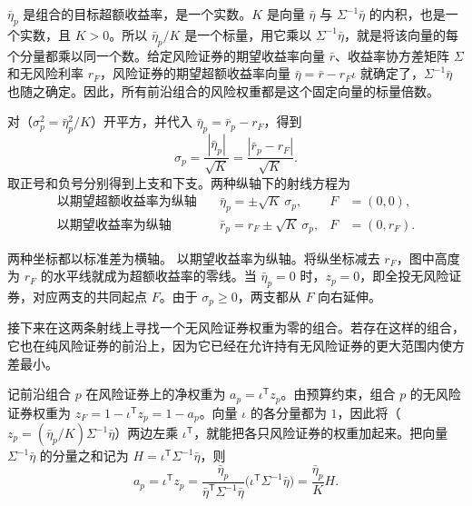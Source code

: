 $\bar\eta_p$ 是组合的目标超额收益率，是一个实数。$K$ 是向量 $\bar\eta$ 与 $\Sigma^{-1}\bar\eta$ 的内积，也是一个实数，且 $K>0$。所以 $\bar\eta_p/K$ 是一个标量，用它乘以 $\Sigma^{-1}\bar\eta$，就是将该向量的每个分量都乘以同一个数。给定风险证券的期望收益率向量 $\bar r$、收益率协方差矩阵 $\Sigma$ 和无风险利率 $r_F$，风险证券的期望超额收益率向量 $\bar\eta=\bar r-r_F\iota$ 就确定了，$\Sigma^{-1}\bar\eta$ 也随之确定。因此，所有前沿组合的风险权重都是这个固定向量的标量倍数。

对（$\sigma_p^2=\bar\eta_p^2/K$）开平方，并代入 $\bar\eta_p=\bar r_p-r_F$，得到
\[
 \sigma_p=\frac{|\bar\eta_p|}{\sqrt K}
         =\frac{|\bar r_p-r_F|}{\sqrt K}.
\]
取正号和负号分别得到上支和下支。两种纵轴下的射线方程为
\[
 \begin{aligned}
 \text{以期望超额收益率为纵轴}\quad &\bar\eta_p=\pm\sqrt K\,\sigma_p,
 & F&=(0,0),\\
 \text{以期望收益率为纵轴}\quad &\bar r_p=r_F\pm\sqrt K\,\sigma_p,
 & F&=(0,r_F).
 \end{aligned}
\]

\begin{center}
\begin{minipage}{\linewidth}
\centering
\renewcommand{\thewjFigure}{\thechapter.S\arabic{wjFigure}}%
%
\par
{}
\end{minipage}
\end{center}

两种坐标都以标准差为横轴。 以期望收益率为纵轴。将纵坐标减去 $r_F$，图中高度为 $r_F$ 的水平线就成为超额收益率的零线。当 $\bar\eta_p=0$ 时，$z_p=0$，即全投无风险证券，对应两支的共同起点 $F$。由于 $\sigma_p\ge0$，两支都从 $F$ 向右延伸。

接下来在这两条射线上寻找一个无风险证券权重为零的组合。若存在这样的组合，它也在纯风险证券的前沿上，因为它已经在允许持有无风险证券的更大范围内使方差最小。

记前沿组合 $p$ 在风险证券上的净权重为 $a_p=\iota^{\mathsf T}z_p$。由预算约束，组合 $p$ 的无风险证券权重为 $z_F=1-\iota^{\mathsf T}z_p=1-a_p$。向量 $\iota$ 的各分量都为 $1$，因此将（$z_p=(\bar\eta_p/K)\Sigma^{-1}\bar\eta$）两边左乘 $\iota^{\mathsf T}$，就能把各只风险证券的权重加起来。把向量 $\Sigma^{-1}\bar\eta$ 的分量之和记为 $H=\iota^{\mathsf T}\Sigma^{-1}\bar\eta$，则
\[
 a_p=\iota^{\mathsf T}z_p
 =\frac{\bar\eta_p}{\bar\eta^{\mathsf T}\Sigma^{-1}\bar\eta}
  \bigl(\iota^{\mathsf T}\Sigma^{-1}\bar\eta\bigr)
 =\frac{\bar\eta_p}{K}H.
\]

